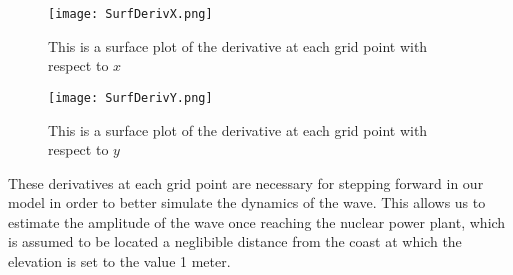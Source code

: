 \documentclass[../main.tex]{subfiles}
\begin{document}
\begin{figure}[H]
\centering
\texttt{[image: SurfDerivX.png]}
\caption{This is a surface plot of the derivative at each grid point with respect to $x$}
\end{figure}

\begin{figure}[H]
\centering
\texttt{[image: SurfDerivY.png]}
\caption{This is a surface plot of the derivative at each grid point with respect to $y$}
\end{figure}

\noindent These derivatives at each grid point are necessary for stepping forward in our model in order to better simulate the dynamics of the wave. This allows us to estimate the amplitude of the wave once reaching the nuclear power plant, which is assumed to be located a neglibible distance from the coast at which the elevation is set to the value 1 meter.
\end{document}
